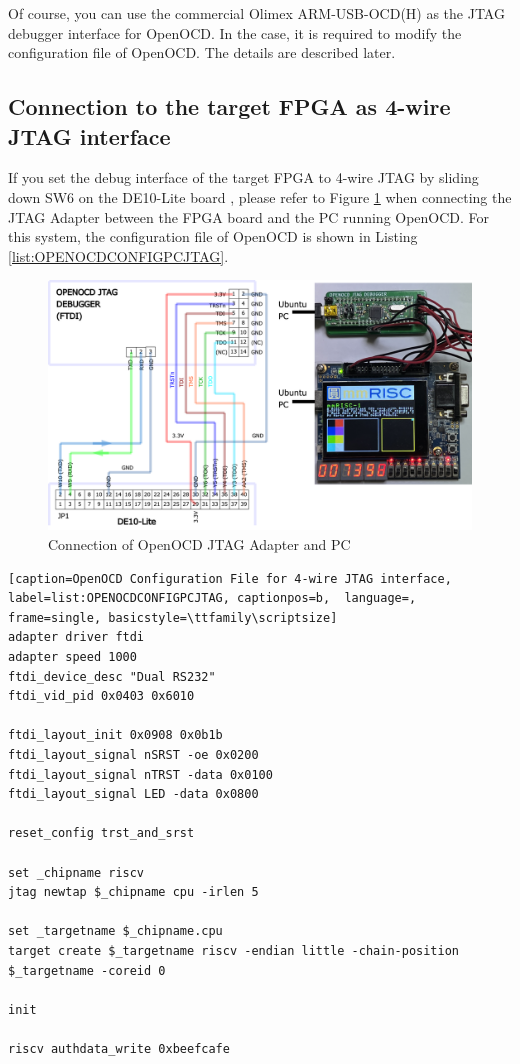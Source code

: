 Of course, you can use the commercial Olimex ARM-USB-OCD(H) as the JTAG debugger interface for OpenOCD. In the case, it is required to modify the configuration file of OpenOCD. The details are described later.

\subsection{Connection to the target FPGA as 4-wire JTAG interface}
\label{sec:CONNECTADAPTERJTAG}

If you set the debug interface of the target FPGA to 4-wire JTAG by sliding down SW6 on the DE10-Lite board , please refer to Figure \ref{fig:USBJTAGCONNECTIONPC} when connecting the JTAG Adapter between the FPGA board and the PC running OpenOCD. For this system, the configuration file of OpenOCD is shown in Listing \ref{list:OPENOCDCONFIGPCJTAG}.


\begin{figure}[H]
    \includegraphics[width=1.0\columnwidth]{./Figure/USB_JTAG_Connection_PC.png}
    \caption{Connection of OpenOCD JTAG Adapter and PC}
    \label{fig:USBJTAGCONNECTIONPC}
\end{figure}

\begin{lstlisting}[caption=OpenOCD Configuration File for 4-wire JTAG interface, label=list:OPENOCDCONFIGPCJTAG, captionpos=b,  language=, frame=single, basicstyle=\ttfamily\scriptsize]
adapter driver ftdi
adapter speed 1000
ftdi_device_desc "Dual RS232"
ftdi_vid_pid 0x0403 0x6010

ftdi_layout_init 0x0908 0x0b1b
ftdi_layout_signal nSRST -oe 0x0200
ftdi_layout_signal nTRST -data 0x0100
ftdi_layout_signal LED -data 0x0800

reset_config trst_and_srst

set _chipname riscv
jtag newtap $_chipname cpu -irlen 5

set _targetname $_chipname.cpu
target create $_targetname riscv -endian little -chain-position $_targetname -coreid 0

init

riscv authdata_write 0xbeefcafe
\end{lstlisting}


